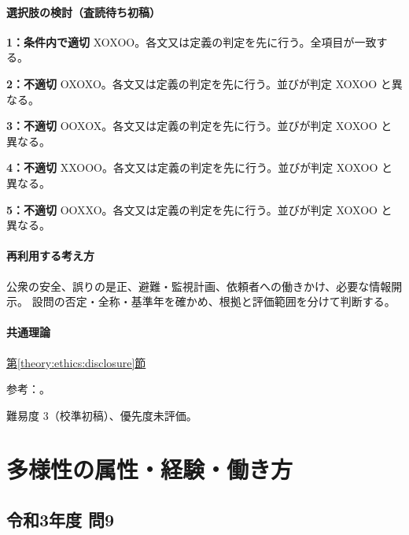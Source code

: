 \paragraph{選択肢の検討（査読待ち初稿）}\mbox{}\par

\noindent\textbf{1：条件内で適切} XOXOO。各文又は定義の判定を先に行う。全項目が一致する。\par

\noindent\textbf{2：不適切} OXOXO。各文又は定義の判定を先に行う。並びが判定 XOXOO と異なる。\par

\noindent\textbf{3：不適切} OOXOX。各文又は定義の判定を先に行う。並びが判定 XOXOO と異なる。\par

\noindent\textbf{4：不適切} XXOOO。各文又は定義の判定を先に行う。並びが判定 XOXOO と異なる。\par

\noindent\textbf{5：不適切} OOXXO。各文又は定義の判定を先に行う。並びが判定 XOXOO と異なる。\par

\paragraph{再利用する考え方} 公衆の安全、誤りの是正、避難・監視計画、依頼者への働きかけ、必要な情報開示。 設問の否定・全称・基準年を確かめ、根拠と評価範囲を分けて判断する。

\paragraph{共通理論} \hyperref[theory:ethics:disclosure]{第\ref*{theory:ethics:disclosure}節}

\par 参考：\cite{ipej_ethics2011,scu_ethics_framework}。

\par 難易度 3（校準初稿）、優先度未評価。

\section{多様性の属性・経験・働き方}

\subsection{令和3年度 問9}
\label{q:r03-reg-apt-09}

